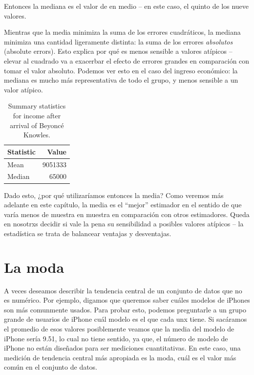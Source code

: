 \documentclass[
  12pt,
]{book}
\begin{document}
Entonces la mediana es el valor de en medio -- en este caso, el quinto de los nueve valores.

Mientras que la media minimiza la suma de los errores cuadráticos, la mediana minimiza una cantidad ligeramente distinta: la suma de los errores \emph{absolutos} (absolute errors). Esto explica por qué es menos sensible a valores atípicos -- elevar al cuadrado va a exacerbar el efecto de errores grandes en comparación con tomar el valor absoluto. Podemos ver esto en el caso del ingreso económico: la mediana es mucho más representativa de todo el grupo, y menos sensible a un valor atípico.

\begin{table}

\caption{\label{tab:unnamed-chunk-20}Summary statistics for income after arrival of Beyoncé Knowles.}
\centering
\begin{tabular}[t]{l|r}
\hline
Statistic & Value\\
\hline
Mean & 9051333\\
\hline
Median & 65000\\
\hline
\end{tabular}
\end{table}

Dado esto, ¿por qué utilizaríamos entonces la media? Como veremos más adelante en este capítulo, la media es el ``mejor'' estimador en el sentido de que varía menos de muestra en muestra en comparación con otros estimadores. Queda en nosotrxs decidir si vale la pena su sensibilidad a posibles valores atípicos -- la estadística se trata de balancear ventajas y desventajas.

\hypertarget{la-moda}{%
\section{La moda}\label{la-moda}}

A veces deseamos describir la tendencia central de un conjunto de datos que no es numérico. Por ejemplo, digamos que queremos saber cuáles modelos de iPhones son más comunmente usados. Para probar esto, podemos preguntarle a un grupo grande de usuarios de iPhone cuál modelo es el que cada unx tiene. Si sacáramos el promedio de esos valores posiblemente veamos que la media del modelo de iPhone sería 9.51, lo cual no tiene sentido, ya que, el número de modelo de iPhone no están diseñados para ser mediciones cuantitativas. En este caso, una medición de tendencia central más apropiada es la moda, cuál es el valor más común en el conjunto de datos.
\end{document}

